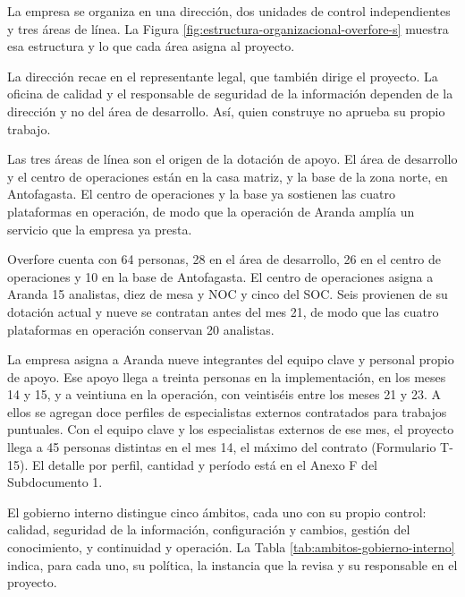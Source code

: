 \documentclass[subdoc]{../../comun/overfore}
\begin{document}
La empresa se organiza en una dirección, dos unidades de control independientes y tres áreas de línea. La Figura \ref{fig:estructura-organizacional-overfore-s} muestra esa estructura y lo que cada área asigna al proyecto.

La dirección recae en el representante legal, que también dirige el proyecto. La oficina de calidad y el responsable de seguridad de la información dependen de la dirección y no del área de desarrollo. Así, quien construye no aprueba su propio trabajo.

Las tres áreas de línea son el origen de la dotación de apoyo. El área de desarrollo y el centro de operaciones están en la casa matriz, y la base de la zona norte, en Antofagasta. El centro de operaciones y la base ya sostienen las cuatro plataformas en operación, de modo que la operación de Aranda amplía un servicio que la empresa ya presta.

Overfore cuenta con 64 personas, 28 en el área de desarrollo, 26 en el centro de operaciones y 10 en la base de Antofagasta. El centro de operaciones asigna a Aranda 15 analistas, diez de mesa y NOC y cinco del SOC. Seis provienen de su dotación actual y nueve se contratan antes del mes 21, de modo que las cuatro plataformas en operación conservan 20 analistas.

La empresa asigna a Aranda nueve integrantes del equipo clave y personal propio de apoyo. Ese apoyo llega a treinta personas en la implementación, en los meses 14 y 15, y a veintiuna en la operación, con veintiséis entre los meses 21 y 23. A ellos se agregan doce perfiles de especialistas externos contratados para trabajos puntuales. Con el equipo clave y los especialistas externos de ese mes, el proyecto llega a 45 personas distintas en el mes 14, el máximo del contrato (Formulario T-15). El detalle por perfil, cantidad y período está en el Anexo F del Subdocumento 1.

El gobierno interno distingue cinco ámbitos, cada uno con su propio control: calidad, seguridad de la información, configuración y cambios, gestión del conocimiento, y continuidad y operación. La Tabla \ref{tab:ambitos-gobierno-interno} indica, para cada uno, su política, la instancia que la revisa y su responsable en el proyecto.
\end{document}
